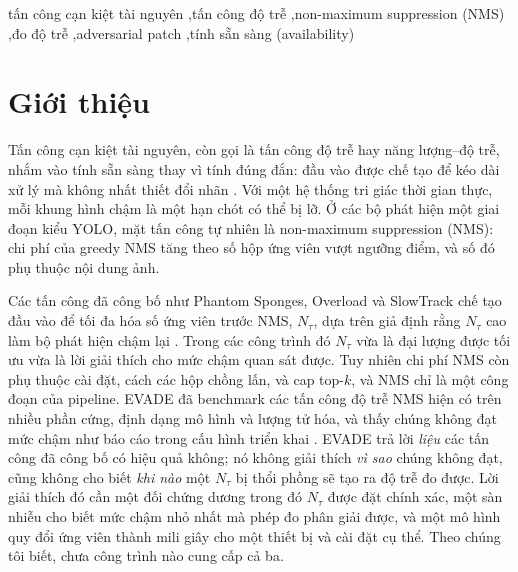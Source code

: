 \documentclass[a4paper,fleqn]{cas-dc}
\newcommand{\Ntau}{N_{\tau}}
\begin{document}
\begin{keywords}
tấn công cạn kiệt tài nguyên \sep tấn công độ trễ \sep non-maximum suppression (NMS) \sep đo độ trễ \sep adversarial patch \sep tính sẵn sàng (availability)
\end{keywords}

\maketitle

\section{Giới thiệu}
Tấn công cạn kiệt tài nguyên, còn gọi là tấn công độ trễ hay năng lượng--độ trễ, nhắm vào tính sẵn sàng thay vì tính đúng đắn: đầu vào được chế tạo để kéo dài xử lý mà không nhất thiết đổi nhãn \cite{shumailov2021sponge,nicgslowdown2022}. Với một hệ thống tri giác thời gian thực, mỗi khung hình chậm là một hạn chót có thể bị lỡ. Ở các bộ phát hiện một giai đoạn kiểu YOLO, mặt tấn công tự nhiên là non-maximum suppression (NMS): chi phí của greedy NMS tăng theo số hộp ứng viên vượt ngưỡng điểm, và số đó phụ thuộc nội dung ảnh.

Các tấn công đã công bố như Phantom Sponges, Overload và SlowTrack chế tạo đầu vào để tối đa hóa số ứng viên trước NMS, $\Ntau$, dựa trên giả định rằng $\Ntau$ cao làm bộ phát hiện chậm lại \cite{phantom2023,overload2024,slowtrack2024}. Trong các công trình đó $\Ntau$ vừa là đại lượng được tối ưu vừa là lời giải thích cho mức chậm quan sát được. Tuy nhiên chi phí NMS còn phụ thuộc cài đặt, cách các hộp chồng lấn, và cap top-$k$, và NMS chỉ là một công đoạn của pipeline. EVADE đã benchmark các tấn công độ trễ NMS hiện có trên nhiều phần cứng, định dạng mô hình và lượng tử hóa, và thấy chúng không đạt mức chậm như báo cáo trong cấu hình triển khai \cite{evade2025}. EVADE trả lời \emph{liệu} các tấn công đã công bố có hiệu quả không; nó không giải thích \emph{vì sao} chúng không đạt, cũng không cho biết \emph{khi nào} một $\Ntau$ bị thổi phồng sẽ tạo ra độ trễ đo được. Lời giải thích đó cần một đối chứng dương trong đó $\Ntau$ được đặt chính xác, một sàn nhiễu cho biết mức chậm nhỏ nhất mà phép đo phân giải được, và một mô hình quy đổi ứng viên thành mili giây cho một thiết bị và cài đặt cụ thể. Theo chúng tôi biết, chưa công trình nào cung cấp cả ba.
\end{document}
